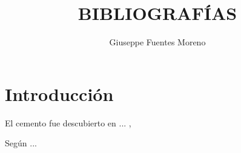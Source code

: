 \documentclass{article}
\title{BIBLIOGRAFÍAS}
\author{Giuseppe Fuentes Moreno}
\begin{document}
\section{Introducción}
El cemento fue descubierto en ... ,\citep{cemento}

Según \cite{cemento}...
\end{document}
